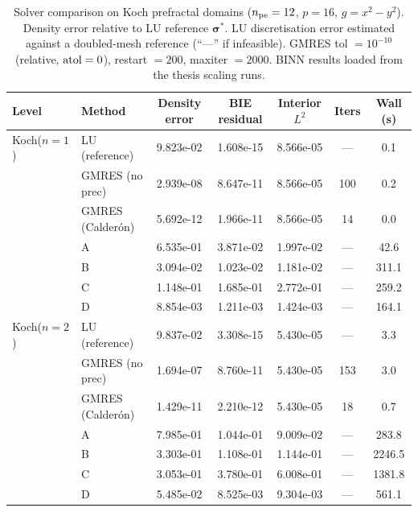 \begin{table}[ht]
\centering
\caption{Solver comparison on Koch prefractal domains ($n_{\rm pe}=12$, $p=16$, $g=x^2-y^2$). Density error relative to LU reference $\boldsymbol{\sigma}^*$. LU discretisation error estimated against a doubled-mesh reference (``—'' if infeasible). GMRES tol $=10^{-10}$ (relative, ${\rm atol}=0$), restart $=200$, maxiter $=2000$. BINN results loaded from the thesis scaling runs.}
\label{tab:solver-comparison}
\begin{tabular}{@{}llccccc@{}}
\toprule
Level & Method & Density error & BIE residual & Interior $L^2$ & Iters & Wall (s) \\
\midrule
  Koch($n=1$) & LU (reference) & 9.823e-02 & 1.608e-15 & 8.566e-05 & — & 0.1 \\
   & GMRES (no prec) & 2.939e-08 & 8.647e-11 & 8.566e-05 & 100 & 0.2 \\
   & GMRES (Calderón) & 5.692e-12 & 1.966e-11 & 8.566e-05 & 14 & 0.0 \\
   & A & 6.535e-01 & 3.871e-02 & 1.997e-02 & — & 42.6 \\
   & B & 3.094e-02 & 1.023e-02 & 1.181e-02 & — & 311.1 \\
   & C & 1.148e-01 & 1.685e-01 & 2.772e-01 & — & 259.2 \\
   & D & 8.854e-03 & 1.211e-03 & 1.424e-03 & — & 164.1 \\
\midrule
  Koch($n=2$) & LU (reference) & 9.837e-02 & 3.308e-15 & 5.430e-05 & — & 3.3 \\
   & GMRES (no prec) & 1.694e-07 & 8.760e-11 & 5.430e-05 & 153 & 3.0 \\
   & GMRES (Calderón) & 1.429e-11 & 2.210e-12 & 5.430e-05 & 18 & 0.7 \\
   & A & 7.985e-01 & 1.044e-01 & 9.009e-02 & — & 283.8 \\
   & B & 3.303e-01 & 1.108e-01 & 1.144e-01 & — & 2246.5 \\
   & C & 3.053e-01 & 3.780e-01 & 6.008e-01 & — & 1381.8 \\
   & D & 5.485e-02 & 8.525e-03 & 9.304e-03 & — & 561.1 \\
\bottomrule
\end{tabular}
\end{table}